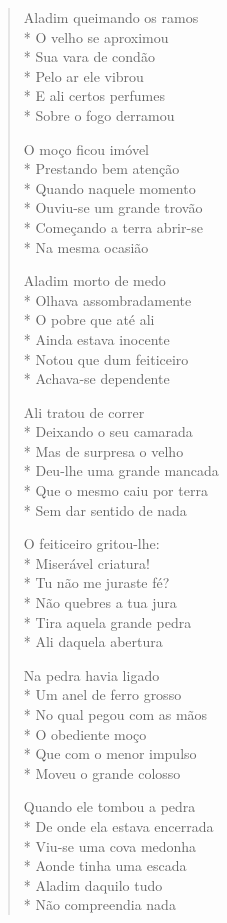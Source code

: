 \begin{verse}
Aladim queimando os ramos\\*
O velho se aproximou\\*
Sua vara de condão\\*
Pelo ar ele vibrou\\*
E ali certos perfumes\\*
Sobre o fogo derramou

O moço ficou imóvel\\*
Prestando bem atenção\\*
Quando naquele momento\\*
Ouviu-se um grande trovão\\*
Começando a terra abrir-se\\*
Na mesma ocasião

Aladim morto de medo\\*
Olhava assombradamente\\*
O pobre que até ali\\*
Ainda estava inocente\\*
Notou que dum feiticeiro\\*
Achava-se dependente

Ali tratou de correr\\*
Deixando o seu camarada\\*
Mas de surpresa o velho\\*
Deu-lhe uma grande mancada\\*
Que o mesmo caiu por terra\\*
Sem dar sentido de nada

O feiticeiro gritou-lhe:\\*
Miserável criatura!\\*
Tu não me juraste fé?\\*
Não quebres a tua jura\\*
Tira aquela grande pedra\\*
Ali daquela abertura

Na pedra havia ligado\\*
Um anel de ferro grosso\\*
No qual pegou com as mãos\\*
O obediente moço\\*
Que com o menor impulso\\*
Moveu o grande colosso

Quando ele tombou a pedra\\*
De onde ela estava encerrada\\*
Viu-se uma cova medonha\\*
Aonde tinha uma escada\\*
Aladim daquilo tudo\\*
Não compreendia nada


\end{verse}
